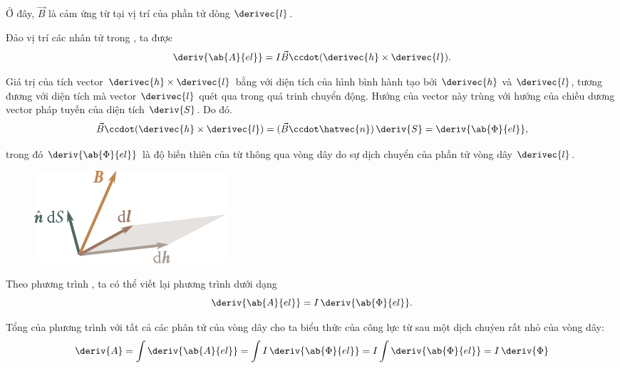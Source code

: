 \noindent
Ở đây, $\vec{B}$ là cảm ứng từ tại vị trí của phần tử dòng $\derivec{l}$.

Đảo vị trí các nhân tử trong , ta được
\begin{equation}\label{eq:6_90}
    \deriv{\ab{A}{el}} = I \vec{B} \ccdot (\derivec{h} \times \derivec{l}).
\end{equation}

\noindent
Giá trị của tích vector $\derivec{h} \times\derivec{l}$ bằng với diện tích của hình bình hành tạo bởi $\derivec{h}$ và $\derivec{l}$, tương đương với diện tích mà vector $\derivec{l}$ quét qua trong quá trinh chuyển động. Hướng của vector này trùng với hướng của chiều dương vector pháp tuyến của diện tích $\deriv{S}$. Do đó.
\begin{equation}\label{eq:6_91}
    \vec{B} \ccdot (\derivec{h} \times \derivec{l}) = (\vec{B} \ccdot \hatvec{n})\, \deriv{S} = \deriv{\ab{\Phi}{el}},
\end{equation}

\noindent
trong đó $\deriv{\ab{\Phi}{el}}$ là độ biến thiên của từ thông qua vòng dây do sự dịch chuyển của phần tử vòng dây $\derivec{l}$.

\begin{figure}[t]
	\begin{center}
		\includegraphics[scale=0.98]{figures/ch_06/fig_6_23.pdf}
		\caption[]{}
		\label{fig:6_23}
	\end{center}
	\vspace{-0.9cm}
\end{figure}

Theo phương trình , ta có thể viết lại phương trình  dưới dạng 
\begin{equation}\label{eq:6_92}
    \deriv{\ab{A}{el}} = I\, \deriv{\ab{\Phi}{el}}.
\end{equation}

\noindent
Tổng của phương trình  với tất cả các phân tử của vòng dây cho ta  biểu thức của công lực từ sau một dịch chuỷen rất nhỏ của vòng dây:  
\begin{equation}\label{eq:6_93}
    \deriv{A} = \int \deriv{\ab{A}{el}} = \int I \, \deriv{\ab{\Phi}{el}} = I \int \deriv{\ab{\Phi}{el}} = I\, \deriv{\Phi}
\end{equation}

